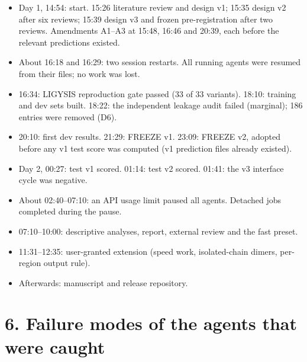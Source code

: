 \documentclass[10pt,letterpaper]{article}
\begin{document}
\begin{itemize}
\item Day 1, 14:54: start. 15:26 literature review and design v1; 15:35 design v2 after six reviews; 15:39 design v3 and frozen pre-registration after two reviews. Amendments A1--A3 at 15:48, 16:46 and 20:39, each before the relevant predictions existed.
\item About 16:18 and 16:29: two session restarts. All running agents were resumed from their files; no work was lost.
\item 16:34: LIGYSIS reproduction gate passed (33 of 33 variants). 18:10: training and dev sets built. 18:22: the independent leakage audit failed (marginal); 186 entries were removed (D6).
\item 20:10: first dev results. 21:29: FREEZE v1. 23:09: FREEZE v2, adopted before any v1 test score was computed (v1 prediction files already existed).
\item Day 2, 00:27: test v1 scored. 01:14: test v2 scored. 01:41: the v3 interface cycle was negative.
\item About 02:40--07:10: an API usage limit paused all agents. Detached jobs completed during the pause.
\item 07:10--10:00: descriptive analyses, report, external review and the fast preset.
\item 11:31--12:35: user-granted extension (speed work, isolated-chain dimers, per-region output rule).
\item Afterwards: manuscript and release repository.
\end{itemize}

\section*{6. Failure modes of the agents that were caught}
\end{document}
